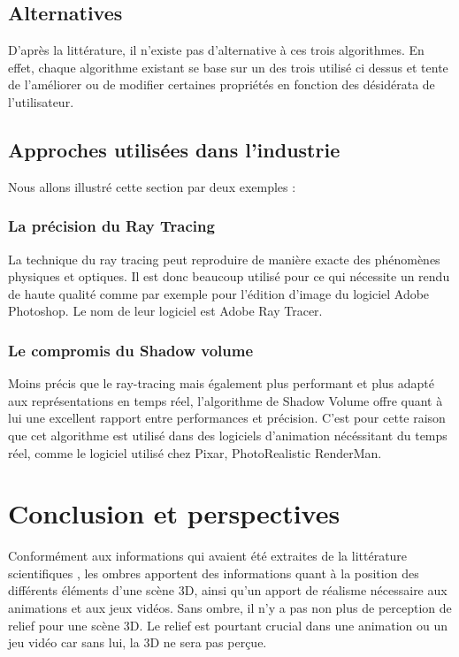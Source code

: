 \documentclass[a4paper,10pt]{report}
\begin{document}
\section{Alternatives}

D'après la littérature, il n'existe pas d'alternative à ces trois algorithmes. En effet, chaque algorithme existant se base sur un des trois utilisé ci dessus et tente de l'améliorer ou de modifier certaines propriétés en fonction des désidérata de l'utilisateur.

\section{Approches utilisées dans l'industrie}

Nous allons illustré cette section par deux exemples :

\subsection{La précision du Ray Tracing}

La technique du ray tracing peut reproduire de manière exacte des phénomènes physiques et optiques. Il est donc beaucoup utilisé pour ce qui nécessite un rendu de haute qualité comme par exemple pour l'édition d'image du logiciel Adobe Photoshop. Le nom de leur logiciel est Adobe Ray Tracer.
\subsection{Le compromis du Shadow volume}

Moins précis que le ray-tracing mais également plus performant et plus adapté aux représentations en temps réel, l'algorithme de Shadow Volume offre quant à lui une excellent rapport entre performances et précision. C'est pour cette raison que cet algorithme est utilisé dans des logiciels d'animation nécéssitant du temps réel, comme le logiciel utilisé chez Pixar, PhotoRealistic RenderMan.


\chapter{Conclusion et perspectives}

Conformément aux informations qui avaient été extraites de la littérature scientifiques , les ombres apportent des informations quant à la position des différents éléments d'une scène 3D, ainsi qu'un apport de réalisme nécessaire aux animations et aux jeux vidéos. Sans ombre, il n'y a pas non plus de perception de relief pour une scène 3D. Le relief est pourtant crucial dans une animation ou un jeu vidéo car sans lui, la 3D ne sera pas perçue. 
\end{document}
